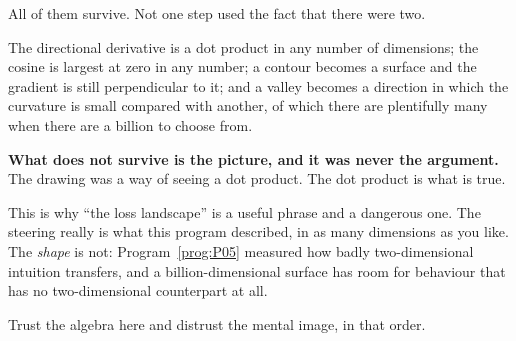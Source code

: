 \begin{fr}
\begin{ansblock}
All of them survive. Not one step used the fact that there were two.
\end{ansblock}

The directional derivative is a dot product in any number of dimensions; the
cosine is largest at zero in any number; a contour becomes a surface and the
gradient is still perpendicular to it; and a valley becomes a direction in
which the curvature is small compared with another, of which there are
plentifully many when there are a billion to choose from.

\textbf{What does not survive is the picture, and it was never the argument.}
The drawing was a way of seeing a dot product. The dot product is what is
true.

\begin{aibox}
This is why \enquote{the loss landscape} is a useful phrase and a dangerous
one. The steering really is what this program described, in as many dimensions
as you like. The \emph{shape} is not: Program~\ref{prog:P05} measured how
badly two-dimensional intuition transfers, and a billion-dimensional surface
has room for behaviour that has no two-dimensional counterpart at all.

Trust the algebra here and distrust the mental image, in that order.
\end{aibox}
\end{fr}

